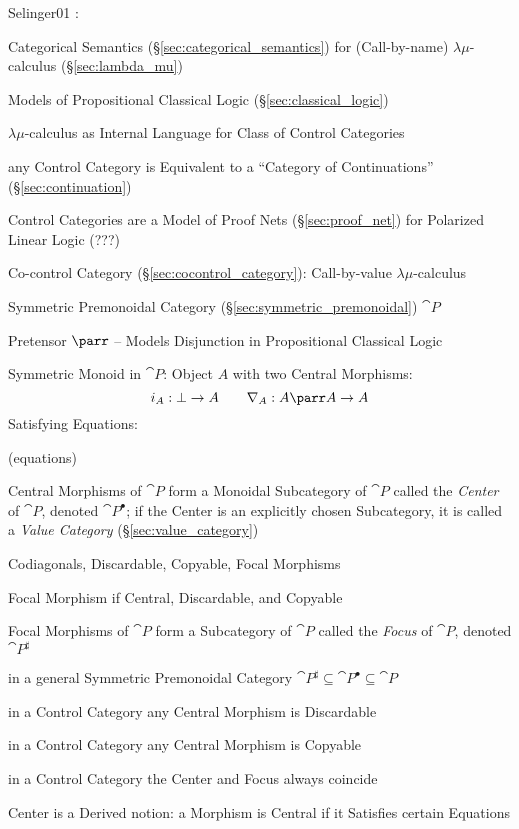 Selinger01 \cite{selinger01}:

Categorical Semantics (\S\ref{sec:categorical_semantics}) for
(Call-by-name) $\lambda\mu$-calculus (\S\ref{sec:lambda_mu})

Models of Propositional Classical Logic (\S\ref{sec:classical_logic})

$\lambda\mu$-calculus as Internal Language for Class of Control
Categories

any Control Category is Equivalent to a ``Category of Continuations''
(\S\ref{sec:continuation})

Control Categories are a Model of Proof Nets (\S\ref{sec:proof_net})
for Polarized Linear Logic (???) %


Co-control Category (\S\ref{sec:cocontrol_category}): Call-by-value
$\lambda\mu$-calculus


\asterism


Symmetric Premonoidal Category (\S\ref{sec:symmetric_premonoidal})
$\cat{P}$

Pretensor $\parr$ -- Models Disjunction in Propositional Classical
Logic

Symmetric Monoid in $\cat{P}$: Object $A$ with two Central Morphisms:
\[
  i_A : \bot \rightarrow A \quad\quad
  \nabla_A : A \parr A \rightarrow A
\]
Satisfying Equations:

(equations) %

Central Morphisms of $\cat{P}$ form a Monoidal Subcategory of
$\cat{P}$ called the \emph{Center} of $\cat{P}$, denoted
$\cat{P}^\bullet$; if the Center is an explicitly chosen Subcategory,
it is called a \emph{Value Category} (\S\ref{sec:value_category})

Codiagonals, Discardable, Copyable, Focal Morphisms %

Focal Morphism if Central, Discardable, and Copyable

Focal Morphisms of $\cat{P}$ form a Subcategory of $\cat{P}$ called
the \emph{Focus} of $\cat{P}$, denoted $\cat{P}^\sharp$

in a general Symmetric Premonoidal Category $\cat{P}^\sharp \subseteq
\cat{P}^\bullet \subseteq \cat{P}$

in a Control Category any Central Morphism is Discardable

in a Control Category any Central Morphism is Copyable

in a Control Category the Center and Focus always coincide

Center is a Derived notion: a Morphism is Central if it Satisfies
certain Equations

